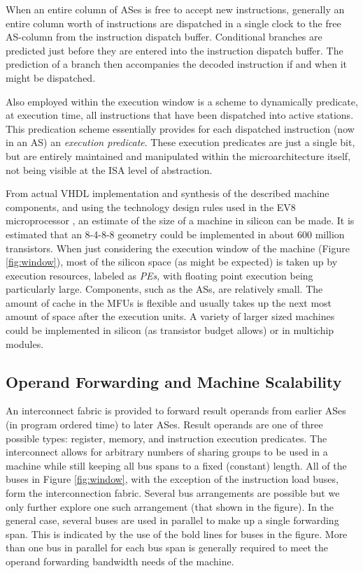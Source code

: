 \documentclass[10pt,twocolumn,dvips]{article}
\begin{document}
When an entire column
of ASes is free to accept new instructions, generally
an entire column worth of instructions are dispatched in a single
clock to the free AS-column 
from the instruction dispatch buffer.
Conditional branches are
predicted just before they are entered into the instruction
dispatch buffer.
The prediction of a branch then accompanies the decoded instruction
if and when it might be dispatched.

Also employed within the execution window is a scheme to
dynamically predicate, at execution time, 
all instructions that have been dispatched
into active stations.  
This predication scheme essentially provides for each dispatched
instruction (now in an AS)
an {\em execution predicate}.  
These execution predicates are just a single bit, 
but are entirely maintained and manipulated within the microarchitecture
itself, not being visible at the ISA level of abstraction.

From actual VHDL implementation and synthesis of 
the described machine components, and using the technology design rules used
in the EV8 microprocessor \cite{Preston02},
an estimate of the size of a machine in silicon can be made.
It is estimated that an 8-4-8-8 geometry could be implemented
in about 600 million transistors.  
When just considering the
execution window of the machine (Figure \ref{fig:window}),
most of the silicon space (as
might be expected) is taken up by execution resources,
labeled as {\em PEs}, with floating point execution being particularly
large.  
Components, such as the ASs, are relatively small.  
The amount of cache in the MFUs is flexible and
usually takes up the next most amount of space after the execution units.  
A variety of larger sized machines could be implemented
in silicon (as transistor budget allows) or in multichip modules.
%
%
\subsection{Operand Forwarding and Machine Scalability}
%
An interconnect fabric is provided to forward result
operands from earlier ASes (in program ordered time) to 
later ASes.  
Result operands are one of three possible types: register, memory, and
instruction execution predicates.
The interconnect allows for arbitrary numbers of sharing
groups to be used in a machine while still keeping all bus
spans to a fixed (constant) length.
All of the buses in
Figure \ref{fig:window}, with the exception of the instruction
load buses, form the interconnection fabric.
Several bus arrangements are possible but we only
further explore one such arrangement (that shown in the figure).
In the general case, several buses are used in parallel to make up
a single forwarding span.
This is indicated by the use of the
bold lines for buses in the figure.
More than one
bus in parallel for each bus span is generally required to meet
the operand forwarding bandwidth needs of the machine.
\end{document}
